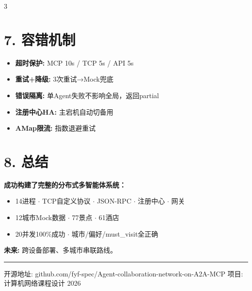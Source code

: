 \documentclass[final]{beamer}
\begin{document}
\begin{frame}[t]
\begin{multicols}{3}
\vspace{0.3cm}
\section*{\color{mainblue}7. 容错机制}

\begin{itemize}[leftmargin=*]
    \item \textbf{超时保护:} MCP 10s / TCP 5s / API 5s
    \item \textbf{重试+降级:} 3次重试→Mock兜底
    \item \textbf{错误隔离:} 单Agent失败不影响全局，返回partial
    \item \textbf{注册中心HA:} 主宕机自动切备用
    \item \textbf{AMap限流:} 指数退避重试
\end{itemize}

\vspace{0.3cm}
\section*{\color{mainblue}8. 总结}
\textbf{成功构建了完整的分布式多智能体系统：}
\begin{itemize}[leftmargin=*]
    \item 14进程 $\cdot$ TCP自定义协议 $\cdot$ JSON-RPC $\cdot$ 注册中心 $\cdot$ 网关
    \item 12城市Mock数据 $\cdot$ 77景点 $\cdot$ 61酒店
    \item 20并发100\%成功 $\cdot$ 城市/偏好/must\_visit全正确
\end{itemize}
\textbf{未来:} 跨设备部署、多城市串联路线。

\end{multicols}

\vspace{0.5cm}
\hrule
\vspace{0.3cm}
\begin{center}
{\small 开源地址: github.com/fyf-spec/Agent-collaboration-network-on-A2A-MCP \hspace{2cm} 项目: 计算机网络课程设计 2026}
\end{center}

\end{frame}
\end{document}
